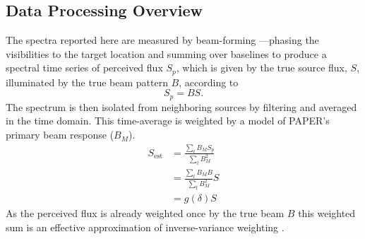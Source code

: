 \documentclass[preprint]{aastex}
\begin{document}

\subsection{Data Processing Overview}
\label{sec:data_overview}
The spectra reported here are measured by beam-forming ---phasing the visibilities to
the target location and summing over baselines to produce a spectral time series of perceived flux $S_p$,
which is given by the true source flux, $S$, illuminated by the true beam pattern $B$, according to
\begin{equation}
S_p=BS.
\end{equation}
The spectrum is then isolated
from neighboring sources by filtering and averaged in the time domain.  This time-average is 
weighted by a model of PAPER's primary beam response ($B_M$).  
\begin{align}
S_\textrm{est} &= \frac{\sum_t B_M S_p}{\sum_t B^2_M} \nonumber \\ 
&= \frac{\sum_t B_M B}{\sum_t B^2_M} S  \nonumber \\
&= g(\delta) S  \label{eq:g}
\end{align}
As the perceived flux is already weighted once by the true beam $B$ this weighted sum is an effective approximation of inverse-variance weighting \citep{Pober:2012p8800}. 
\end{document}
